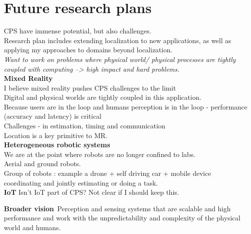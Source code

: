 \documentclass[10pt]{article}
\begin{document}


\section{Future research plans}
CPS have immense potential, but also challenges.\\
Research plan includes extending localization to new applications, as well as applying my approaches to domains beyond localization.\\
\textit{Want to work on problems where physical world/ physical processes are tightly coupled with computing --> high impact and hard problems.}\\

\textbf{Mixed Reality}\\
I believe mixed reality pushes CPS challenges to the limit\\
Digital and physical worlds are tightly coupled in this application.\\
Because users are in the loop and humans perception is in the loop - performance (accuracy and latency) is critical \\
Challenges -  in estimation, timing and communication\\
Location is a key primitive to MR.\\

\textbf{Heterogeneous robotic systems}\\
We are at the point where robots are no longer confined to labs.\\
Aerial and ground robots.\\
Group of robots : example a drone + self driving car + mobile device coordinating and jointly estimating or doing a task.\\

\textbf{IoT}
Isn't IoT part of CPS? Not clear if I should keep this.

\textbf{Broader vision}\
Perception and sensing systems that are scalable and high performance and work with the unpredictability and complexity of the physical world and humans.

\small


\end{document}
